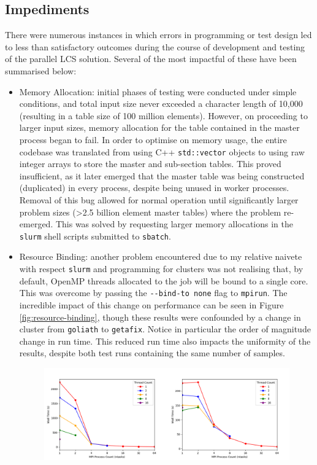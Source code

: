 \subsection{Impediments}
There were numerous instances in which errors in programming or test design led to less than satisfactory outcomes during the course of development and testing of the parallel LCS solution. Several of the most impactful of these have been summarised below: 
\begin{itemize}
    \item Memory Allocation: initial phases of testing were conducted under simple conditions, and total input size never exceeded a character length of 10,000 (resulting in a table size of 100 million elements). However, on proceeding to larger input sizes, memory allocation for the table contained in the master process began to fail. In order to optimise on memory usage, the entire codebase was translated from using C++ \lstinline{std::vector} objects to using raw integer arrays to store the master and sub-section tables. This proved insufficient, as it later emerged that the master table was being constructed (duplicated) in every process, despite being unused in worker processes. Removal of this bug allowed for normal operation until significantly larger problem sizes (\textgreater 2.5 billion element master tables) where the problem re-emerged. This was solved by requesting larger memory allocations in the \lstinline{slurm} shell scripts submitted to \lstinline{sbatch}.
    \item Resource Binding: another problem encountered due to my relative naivete with respect \lstinline{slurm} and programming for clusters was not realising that, by default, OpenMP threads allocated to the job will be bound to a single core. This was overcome by passing the \lstinline{--bind-to none} flag to \lstinline{mpirun}. The incredible impact of this change on performance can be seen in Figure \ref{fig:resource-binding}, though these results were confounded by a change in cluster from \lstinline{goliath} to \lstinline{getafix}. Notice in particular the order of magnitude change in run time. This reduced run time also impacts the uniformity of the results, despite both test runs containing the same number of samples.
    \begin{figure}[H]
    \centering
    \includegraphics[width=18cm]{img/resource-binding.png}

\end{figure}
\end{itemize}
